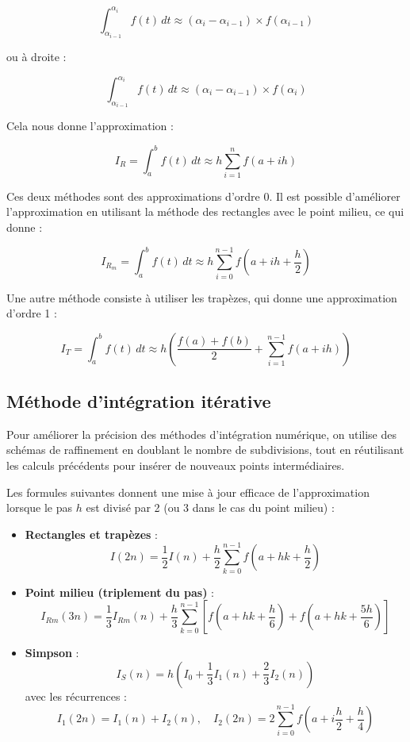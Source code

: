 \documentclass{article}
\begin{document}
\[
\int_{\alpha_{i-1}}^{\alpha_i} f(t) \, dt \approx (\alpha_i - \alpha_{i-1}) \times f(\alpha_{i-1})
\]

ou à droite :

\[
\int_{\alpha_{i-1}}^{\alpha_i} f(t) \, dt \approx (\alpha_i - \alpha_{i-1}) \times f(\alpha_i)
\]

Cela nous donne l'approximation :

\[
I_{R} = \int_{a}^{b} f(t) \, dt \approx h \sum_{i=1}^{n} f(a + i h)
\]

Ces deux méthodes sont des approximations d'ordre 0. Il est possible d'améliorer l'approximation en utilisant la méthode des rectangles avec le point milieu, ce qui donne :

\[
I_{R_m} = \int_{a}^{b} f(t) \, dt \approx h \sum_{i=0}^{n-1} f \left( a + ih + \frac{h}{2} \right)
\]

Une autre méthode consiste à utiliser les trapèzes, qui donne une approximation d'ordre 1 :

\[
I_T = \int_a^b f(t) \, dt \approx h \left( \frac{f(a) + f(b)}{2} + \sum_{i=1}^{n-1} f(a + ih) \right)
\]

\subsection{Méthode d'intégration itérative}
Pour améliorer la précision des méthodes d'intégration numérique, on utilise des schémas de raffinement en doublant le nombre de subdivisions, tout en réutilisant les calculs précédents pour insérer de nouveaux points intermédiaires.

Les formules suivantes donnent une mise à jour efficace de l'approximation lorsque le pas \( h \) est divisé par 2 (ou 3 dans le cas du point milieu) :

\begin{itemize}
  \item \textbf{Rectangles et trapèzes} :
  \[
  I(2n) = \frac{1}{2} I(n) + \frac{h}{2} \sum_{k=0}^{n-1} f\left( a + hk + \frac{h}{2} \right)
  \]
  \item \textbf{Point milieu (triplement du pas)} :
  \[
  I_{Rm}(3n) = \frac{1}{3} I_{Rm}(n) + \frac{h}{3} \sum_{k=0}^{n-1} \left[ f\left( a + hk + \frac{h}{6} \right) + f\left( a + hk + \frac{5h}{6} \right) \right]
  \]
  \item \textbf{Simpson} :
  \[
  I_S(n) = h \left( I_0 + \frac{1}{3} I_1(n) + \frac{2}{3} I_2(n) \right)
  \]
  avec les récurrences :
  \[
  I_1(2n) = I_1(n) + I_2(n), \quad
  I_2(2n) = 2 \sum_{i=0}^{n-1} f\left( a + i \frac{h}{2} + \frac{h}{4} \right)
  \]
\end{itemize}
\end{document}
